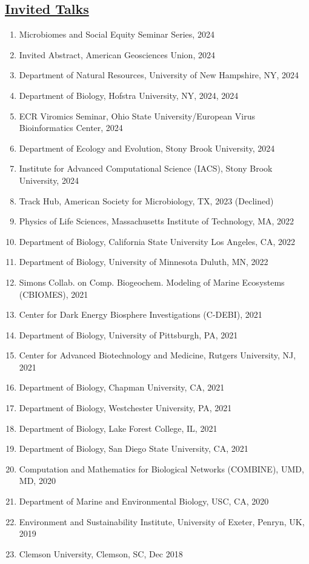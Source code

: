 \documentclass[]{res}
\begin{document}
\begin{resume}
  
   \section{\underline{Invited Talks}} \vspace{2mm}
    \begin{enumerate}[leftmargin=*]
\item Microbiomes and Social Equity Seminar Series, 2024 
\item Invited Abstract, American Geosciences Union, 2024 
\item Department of Natural Resources, University of New Hampshire, NY, 2024
\item Department of Biology, Hofstra University, NY, 2024, 2024
\item ECR Viromics Seminar, Ohio State University/European Virus Bioinformatics Center, 2024
\item Department of Ecology and Evolution, Stony Brook University, 2024
\item Institute for Advanced Computational Science (IACS), Stony Brook University, 2024
\item Track Hub, American Society for Microbiology, TX, 2023 (Declined)
\item Physics of Life Sciences, Massachusetts Institute of Technology, MA, 2022
\item Department of Biology, California State University Los Angeles, CA, 2022
\item Department of Biology, University of Minnesota Duluth, MN, 2022
\item Simons Collab. on Comp. Biogeochem. Modeling of Marine Ecosystems (CBIOMES), 2021
\item Center for Dark Energy Biosphere Investigations (C-DEBI), 2021
\item Department of Biology, University of Pittsburgh, PA, 2021
\item Center for Advanced Biotechnology and Medicine, Rutgers University, NJ, 2021
\item Department of Biology, Chapman University, CA, 2021
\item Department of Biology, Westchester University, PA, 2021
\item Department of Biology, Lake Forest College, IL, 2021
\item Department of Biology, San Diego State University, CA, 2021
\item Computation and Mathematics for Biological Networks (COMBINE), UMD, MD, 2020
\item Department of Marine and Environmental Biology, USC, CA, 2020
\item Environment and Sustainability Institute, University of Exeter, Penryn, UK, 2019
\item Clemson University, Clemson, SC, Dec 2018
\end{enumerate}


\end{resume}
\end{document}
